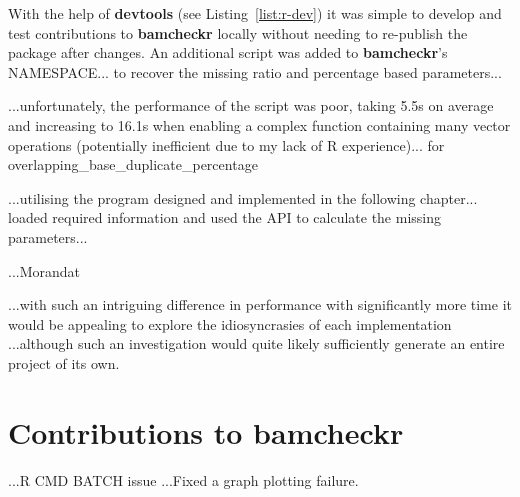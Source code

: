 With the help of \textbf{devtools}\citep{man:devtools} (see
Listing~\ref{list:r-dev}) it was simple to develop and test contributions to
\textbf{bamcheckr} locally without needing to re-publish the package after
changes. An additional script was added to \textbf{bamcheckr}'s NAMESPACE... to
recover the missing ratio and percentage based parameters...

...unfortunately, the performance of the script was poor, taking 5.5s on average
and increasing to 16.1s when enabling a complex function containing many vector
operations (potentially inefficient due to my lack of R experience)...
for overlapping\_base\_duplicate\_percentage

...utilising the program designed and implemented in the following chapter...
loaded required information and used the API to calculate the missing
parameters...

...Morandat\citep{morandat-rperf}

...with such an intriguing difference in performance with significantly more
time it would be appealing to explore the idiosyncrasies of each implementation
...although such an investigation would quite likely sufficiently generate an
entire project of its own.



\section{Contributions to bamcheckr}
...R CMD BATCH issue
...Fixed a graph plotting failure.

